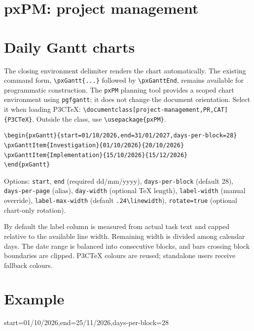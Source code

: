 \documentclass[a4paper]{article}
\begin{document}
\section*{pxPM: project management}
\section{Daily Gantt charts}
The closing environment delimiter renders the chart automatically. The existing
command form, \verb|\pxGantt{...}| followed by \verb|\pxGanttEnd|, remains available for programmatic construction.
The \texttt{pxPM} planning tool provides a scoped chart environment using
\texttt{pgfgantt}; it does not change the document orientation.
Select it when loading P3CTeX: \verb|\documentclass[project-management,PR,CAT]{P3CTeX}|.
Outside the class, use \verb|\usepackage{pxPM}|.

\begin{verbatim}
\begin{pxGantt}{start=01/10/2026,end=31/01/2027,days-per-block=28}
\pxGanttItem{Investigation}{01/10/2026}{20/10/2026}
\pxGanttItem{Implementation}{15/10/2026}{15/12/2026}
\end{pxGantt}
\end{verbatim}

Options: \texttt{start}, \texttt{end} (required dd/mm/yyyy),
\texttt{days-per-block} (default 28), \texttt{days-per-page} (alias),
\texttt{day-width} (optional TeX length), \texttt{label-width} (manual override),
\texttt{label-max-width} (default \verb|.24\linewidth|),
\texttt{rotate=true} (optional chart-only rotation).

By default the label column is measured from actual task text and capped
relative to the available line width. Remaining width is divided among
calendar days. The date range is balanced into consecutive blocks, and
bars crossing block boundaries are clipped. P3CTeX colours are reused;
standalone users receive fallback colours.

\section*{Example}
\begin{pxGantt}{start=01/10/2026,end=25/11/2026,days-per-block=28}
\end{pxGantt}
\end{document}
